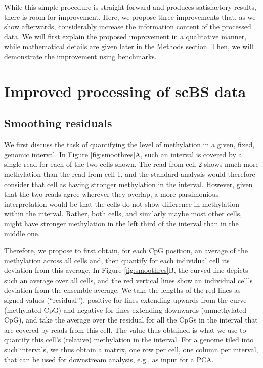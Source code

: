 \documentclass[twocolumn,10pt]{article}
\begin{document}
While this simple procedure is straight-forward and produces satisfactory results, there is room for improvement. Here, we propose three improvements that, as we show afterwards, considerably increase the information content of the processed data. We will first explain the proposed improvement in a qualitative manner, while mathematical details are given later in the Methods section. Then, we will demonstrate the improvement using benchmarks.

\section{Improved processing of scBS data}

\subsection{Smoothing residuals} \label{residuals}

We first discuss the task of quantifying the level of methylation in a given, fixed, genomic interval. In Figure \ref{fig:smoothres}A, such an interval is covered by a single read for each of the two cells shown. The read from cell 2 shows much more methylation than the read from cell 1, and the standard analysis would therefore consider that cell as having stronger methylation in the interval. However, given that the two reads agree wherever they overlap, a more parsimonious interpretation would be that the cells do not show difference in methylation within the interval. Rather, both cells, and similarly maybe most other cells, might have stronger methylation in the left third of the interval than in the middle one.

Therefore, we propose to first obtain, for each CpG position, an average of the methylation across all cells and, then quantify for each individual cell its deviation from this average. In Figure \ref{fig:smoothres}B, the curved line depicts such an average over all cells, and the red vertical lines show an individual cell's deviation from the ensemble average. We take the lengths of the red lines as signed values (``residual''), positive for lines extending upwards from the curve (methylated CpG) and negative for lines extending downwards (unmethylated CpG), and take the average over the residual for all the CpGs in the interval that are covered by reads from this cell. The value thus obtained is what we use to quantify this cell's (relative) methylation in the interval. For a genome tiled into such intervals, we thus obtain a matrix, one row per cell, one column per interval, that can be used for downstream analysis, e.g., as input for a PCA.
\end{document}
